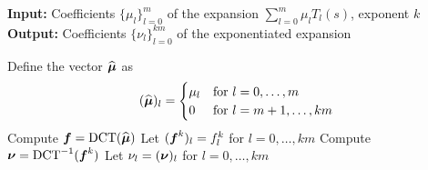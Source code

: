 \hspace*{\algorithmicindent} \textbf{Input:} Coefficients $\{ \mu_l \}_{l=0}^m$ of the expansion $\sum_{l=0}^m \mu_l T_l(s)$, exponent $k$ \\
\hspace*{\algorithmicindent} \textbf{Output:} Coefficients $\{ \nu_l \}_{l=0}^{km}$ of the exponentiated expansion
\begin{algorithmic}[1]
    \State Define the vector $\widehat{\boldsymbol{\mu}}$ as
        \begin{equation}
            (\widehat{\boldsymbol{\mu}})_l = \begin{cases} \mu_l &\text{for $l=0, \dots, m$} \\
                                                     0 &\text{for $l=m+1, \dots, km$} \end{cases}
        \end{equation}
    \State Compute $\boldsymbol{f} = \operatorname{DCT}(\widehat{\boldsymbol{\mu}})$
    \State Let $(\boldsymbol{f}^{k})_l = f_l^k$ for $l=0, \dots, km$
    \State Compute $\boldsymbol{\nu} = \operatorname{DCT}^{-1}(\boldsymbol{f}^{k})$
    \State Let $\nu_l = (\boldsymbol{\nu})_l$ for $l=0, \dots, km$
\end{algorithmic}
